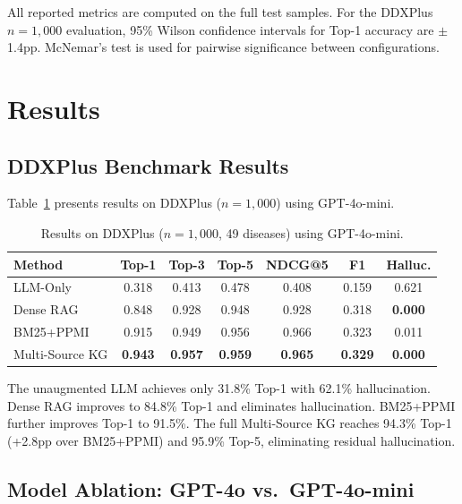 \documentclass[runningheads]{llncs}
\begin{document}
All reported metrics are computed on the full test samples. For the DDXPlus $n{=}1{,}000$ evaluation, 95\% Wilson confidence intervals for Top-1 accuracy are $\pm$1.4pp. McNemar's test is used for pairwise significance between configurations.

\section{Results}
\label{sec:results}

\subsection{DDXPlus Benchmark Results}

Table~\ref{tab:ddxplus} presents results on DDXPlus ($n{=}1{,}000$) using GPT-4o-mini.

\begin{table}[t]
\centering
\caption{Results on DDXPlus ($n{=}1{,}000$, 49 diseases) using GPT-4o-mini.}
\label{tab:ddxplus}
\begin{tabular}{lcccccc}
\toprule
\textbf{Method} & \textbf{Top-1} & \textbf{Top-3} & \textbf{Top-5} & \textbf{NDCG@5} & \textbf{F1} & \textbf{Halluc.} \\
\midrule
LLM-Only       & 0.318 & 0.413 & 0.478 & 0.408 & 0.159 & 0.621 \\
Dense RAG       & 0.848 & 0.928 & 0.948 & 0.928 & 0.318 & \textbf{0.000} \\
BM25+PPMI       & 0.915 & 0.949 & 0.956 & 0.966 & 0.323 & 0.011 \\
Multi-Source KG & \textbf{0.943} & \textbf{0.957} & \textbf{0.959} & \textbf{0.965} & \textbf{0.329} & \textbf{0.000} \\
\bottomrule
\end{tabular}
\end{table}

The unaugmented LLM achieves only 31.8\% Top-1 with 62.1\% hallucination. Dense RAG improves to 84.8\% Top-1 and eliminates hallucination. BM25+PPMI further improves Top-1 to 91.5\%. The full Multi-Source KG reaches 94.3\% Top-1 (+2.8pp over BM25+PPMI) and 95.9\% Top-5, eliminating residual hallucination.

\subsection{Model Ablation: GPT-4o vs.\ GPT-4o-mini}
\label{sec:model_ablation}
\end{document}
